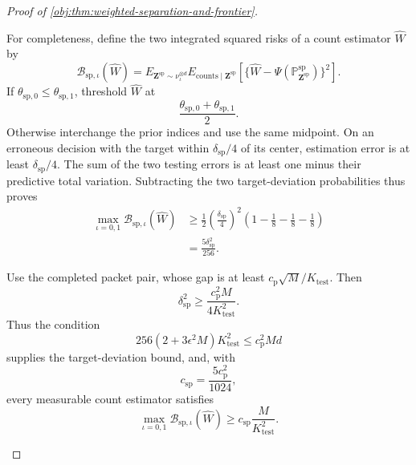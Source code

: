 \begin{proof}[Proof of \cref{obj:thm:weighted-separation-and-frontier}]
\begin{enumerate}
For completeness, define the two integrated squared risks of a count estimator \(\widehat W\) by
\[
\mathcal B_{\mathrm{sp},\iota}(\widehat W)
=
E_{\mathbf Z^{\mathrm{sp}}\sim\nu_\iota^{\otimes d}}
E_{\mathrm{counts}\mid\mathbf Z^{\mathrm{sp}}}
\left[
\{\widehat W-\Psi(\mathbb P_{\mathbf Z^{\mathrm{sp}}}^{\mathrm{sp}})\}^2
\right].
\]
If \(\theta_{\mathrm{sp},0}\le\theta_{\mathrm{sp},1}\), threshold
\(\widehat W\) at
\[
\frac{\theta_{\mathrm{sp},0}+\theta_{\mathrm{sp},1}}2.
\]
Otherwise interchange the prior indices and use the same midpoint. On an erroneous decision with the target within
\(\delta_{\mathrm{sp}}/4\) of its center, estimation error is at least
\(\delta_{\mathrm{sp}}/4\). The sum of the two testing errors is at least one minus their predictive total variation. Subtracting the two target-deviation probabilities thus proves
\[
\begin{aligned}
\max_{\iota=0,1}\mathcal B_{\mathrm{sp},\iota}(\widehat W)
&\ge
\frac12\left(\frac{\delta_{\mathrm{sp}}}{4}\right)^2
\left(1-\frac18-\frac18-\frac18\right)\\
&=\frac{5\delta_{\mathrm{sp}}^2}{256}.
\end{aligned}
\]

Use the completed packet pair, whose gap is at least
\(c_{\mathrm p}\sqrt M/K_{\mathrm{test}}\). Then
\[
\delta_{\mathrm{sp}}^2
\ge\frac{c_{\mathrm p}^2M}{4K_{\mathrm{test}}^2}.
\]
Thus the condition
\[
256(2+3\epsilon^2M)K_{\mathrm{test}}^2
\le c_{\mathrm p}^2Md
\]
supplies the target-deviation bound, and, with
\[
c_{\mathrm{sp}}=\frac{5c_{\mathrm p}^2}{1024},
\]
every measurable count estimator satisfies
\[
\max_{\iota=0,1}\mathcal B_{\mathrm{sp},\iota}(\widehat W)
\ge c_{\mathrm{sp}}\frac{M}{K_{\mathrm{test}}^2}.
\]


\end{enumerate}
\end{proof}
